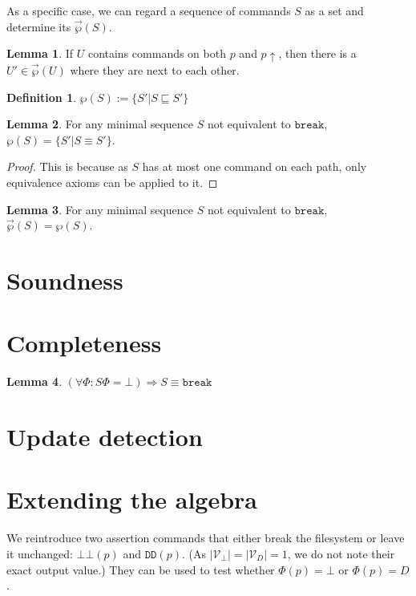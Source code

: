 \documentclass[12pt]{article}
\newcommand{\setvx}[1]{\mathcal{V}_{#1}}
\newcommand{\setd}{\setvx{D}}
\newcommand{\setb}{\setvx{\empt}}
\newcommand{\empt}{\bot}
\newcommand{\FS}{\Phi} %
\newcommand{\pp}{p\!\!\uparrow} %
\newcommand{\cbrk}{\mathtt{break}}
\newcommand{\fscommand}[2]{{#1#2}}
\newcommand{\fsregcommandchar}[1]{\mathtt{#1}}
\newcommand{\fsregcommand}[2]{\fscommand{\fsregcommandchar{#1}}{\fsregcommandchar{#2}}}
\newcommand{\cbb}{\fsregcommand{\empt}{\empt}}
\newcommand{\cdd}{\fsregcommand{D}{D}}
\newcommand{\eqext}{\sqsubseteq}
\newcommand{\extset}[1]{\wp({#1})}
\newcommand{\orderset}[1]{\vec{\wp}({#1})}
\theoremstyle{definition}
\newtheorem{mydef}{Definition}
\newtheorem{mylem}{Lemma}
\begin{document}
As a specific case, we can regard a sequence of commands $S$
as a set and determine its $\orderset{S}$.

\begin{mylem}\label{lemma:neighbour}
If $U$ contains commands on both $p$ and $\pp$, then
there is a $U'\in\orderset{U}$ where they are next to each other.
\end{mylem}

\begin{mydef}
$\extset{S} := \{S'|S\eqext S'\}$
\end{mydef}

\begin{mylem}\label{lemma:minextset}
For any minimal sequence $S$ not equivalent to $\cbrk$, $\extset{S} = \{S'|S\equiv S'\}$.
\end{mylem}
\begin{proof}
This is because as $S$ has at most one command on each path, only equivalence axioms
can be applied to it.
\end{proof}

\begin{mylem}\label{lemma:minextorder}
For any minimal sequence $S$ not equivalent to $\cbrk$,
$\orderset{S} = \extset{S}$.
\end{mylem}


\section{Soundness}

\section{Completeness}

\begin{mylem}
\((\forall\FS: S\FS = \empt) \Rightarrow S \equiv \cbrk\)
\end{mylem}

\section{Update detection}

\section{Extending the algebra}

We reintroduce two assertion commands that either break the filesystem
or leave it unchanged: $\cbb(p)$ and $\cdd(p)$.
(As $|\setb|=|\setd|=1$, we do not note their exact output value.)
They can be used to test whether $\FS(p)=\empt$ or $\FS(p)=D$.
\end{document}
